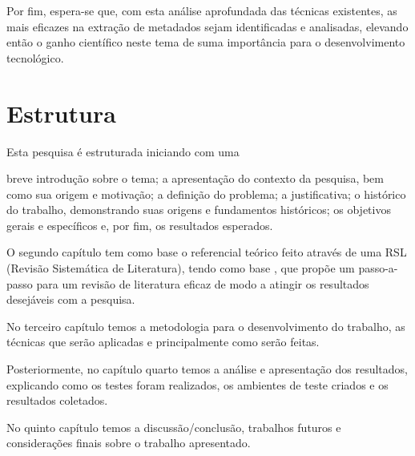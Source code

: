 \begin{textnew}

Por fim, espera-se que, com esta análise aprofundada das técnicas existentes, as mais eficazes na extração de metadados sejam identificadas e analisadas, elevando então o ganho científico neste tema de suma importância para o desenvolvimento tecnológico.

\end{textnew}

\section{Estrutura}
\label{sec:structure}

Esta pesquisa é estruturada iniciando com uma \begin{textedited} breve introdução sobre o tema; a apresentação do contexto da pesquisa, bem como sua origem e motivação; a definição do problema; a justificativa; o histórico do trabalho, demonstrando suas origens e fundamentos históricos; os objetivos gerais e específicos e, por fim, os resultados esperados.\end{textedited}

O segundo capítulo tem como base o referencial teórico feito através de uma RSL (Revisão Sistemática de Literatura), tendo como base \cite{Kitchenham}, que propõe um passo-a-passo para um revisão de literatura eficaz de modo a atingir os resultados desejáveis com a pesquisa.

No terceiro capítulo temos a metodologia para o desenvolvimento do trabalho, as técnicas que serão aplicadas e principalmente como serão feitas. \begin{textedited}Posteriormente, no capítulo quarto temos a análise e apresentação dos resultados, explicando como os testes foram realizados, os ambientes de teste criados e os resultados coletados.\end{textedited}

No quinto capítulo temos a discussão/conclusão, trabalhos futuros e considerações finais sobre o trabalho apresentado.


